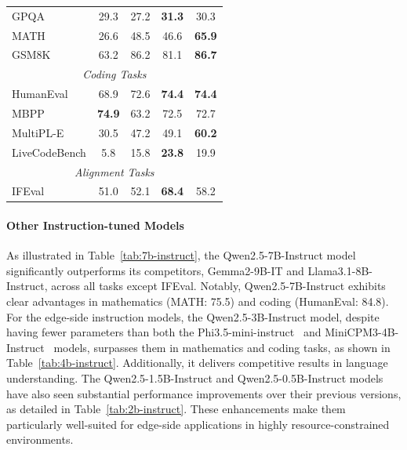 \documentclass{article}
\begin{document}
\begin{table}[t]
\begin{tabular}{@{}lcccc@{}}
GPQA & 29.3 & 27.2 & \textbf{31.3} & 30.3 \\

MATH & 26.6 & 48.5 & 46.6 & \textbf{65.9} \\

GSM8K & 63.2 & 86.2 & 81.1 & \textbf{86.7} \\

\midrule

\multicolumn{5}{c}{\textit{Coding Tasks}} \\

\midrule

HumanEval & 68.9 & 72.6 & \textbf{74.4} & \textbf{74.4} \\

MBPP & \textbf{74.9} & 63.2 & 72.5 & 72.7 \\

MultiPL-E & 30.5 & 47.2 & 49.1 & \textbf{60.2} \\

LiveCodeBench & 5.8 & 15.8 & \textbf{23.8} & 19.9 \\

\midrule

\multicolumn{5}{c}{\textit{Alignment Tasks}} \\

\midrule

IFEval & 51.0 & 52.1 & \textbf{68.4} & 58.2 \\

\bottomrule

\end{tabular}

\end{table}

\paragraph{Other Instruction-tuned Models} 
As illustrated in Table~\ref{tab:7b-instruct}, the Qwen2.5-7B-Instruct model significantly outperforms its competitors, Gemma2-9B-IT and Llama3.1-8B-Instruct, across all tasks except IFEval. Notably, Qwen2.5-7B-Instruct exhibits clear advantages in mathematics (MATH: 75.5) and coding (HumanEval: 84.8).
For the edge-side instruction models, the Qwen2.5-3B-Instruct model, despite having fewer parameters than both the Phi3.5-mini-instruct~\citep{phi3} and MiniCPM3-4B-Instruct~\citep{minicpm} models, surpasses them in mathematics and coding tasks, as shown in Table~\ref{tab:4b-instruct}. Additionally, it delivers competitive results in language understanding.
The Qwen2.5-1.5B-Instruct and Qwen2.5-0.5B-Instruct models have also seen substantial performance improvements over their previous versions, as detailed in Table~\ref{tab:2b-instruct}. These enhancements make them particularly well-suited for edge-side applications in highly resource-constrained environments.
\end{document}
